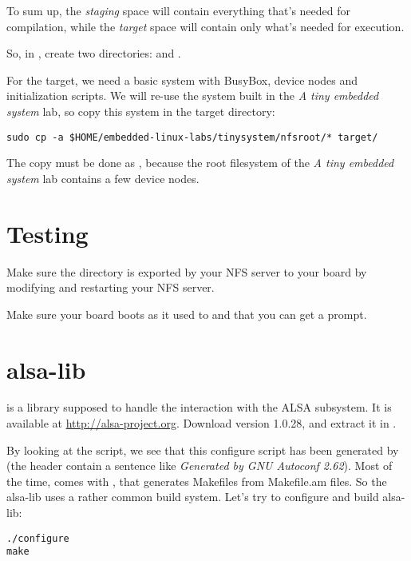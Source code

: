To sum up, the {\em staging} space will contain everything that's
needed for compilation, while the {\em target} space will contain only
what's needed for execution.

So, in , create two
directories:  and .

For the target, we need a basic system with BusyBox, device nodes and
initialization scripts. We will re-use the system built in the {\em A
  tiny embedded system} lab, so copy this system in the target
directory:

\begin{verbatim}
sudo cp -a $HOME/embedded-linux-labs/tinysystem/nfsroot/* target/
\end{verbatim}

The copy must be done as , because the root filesystem of
the {\em A tiny embedded system} lab contains a few device nodes.

\section{Testing}

Make sure the  directory is exported by your NFS server
to your board by modifying  and restarting your NFS
server.

Make sure your board boots as it used to and that you can get a
prompt.

\section{alsa-lib}

 is a library supposed to handle the interaction with
the ALSA subsystem. It is available at
\url{http://alsa-project.org}. Download version 1.0.28, and extract it
in .

By looking at the  script, we see that this configure
script has been generated by  (the header contain a
sentence like {\em Generated by GNU Autoconf 2.62}). Most of the time,
 comes with , that generates Makefiles
from Makefile.am files. So the alsa-lib uses a rather common build
system. Let's try to configure and build alsa-lib:

\begin{verbatim}
./configure
make
\end{verbatim}

